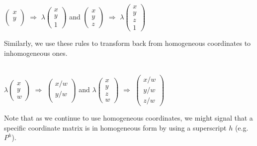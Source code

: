 \documentclass[]{article}
\begin{document}
	
	\begin{center}
		$\begin{pmatrix}
		x \\
		y \\
		\end{pmatrix}
		$
		$\Rightarrow$
		$\lambda\begin{pmatrix}
		x \\
		y \\
		1
		\end{pmatrix}
		$
		and
		$\begin{pmatrix}
		x \\
		y \\
		z
		\end{pmatrix}
		$
		$\Rightarrow$
		$\lambda\begin{pmatrix}
		x \\
		y \\
		z \\
		1
		\end{pmatrix}
		$
	\end{center}
	Similarly, we use these rules to transform back from homogeneous coordinates to inhomogeneous ones. \\\\
	\begin{center}
		$\lambda\begin{pmatrix}
		x \\
		y \\
		w
		\end{pmatrix}
		$
		$\Rightarrow$
		$\begin{pmatrix}
		x/w \\
		y/w \\
		\end{pmatrix}
		$
		and
		$\lambda\begin{pmatrix}
		x \\
		y \\
		z \\
		w
		\end{pmatrix}
		$
		$\Rightarrow$
		$\begin{pmatrix}
		x/w \\
		y/w \\
		z/w
		\end{pmatrix}
		$
	\end{center}
	Note that as we continue to use homogeneous coordinates, we might signal that a specific coordinate matrix is in homogeneous form by using a superscript $h$ (e.g. $P^h$).
	
	
	
\end{document}
